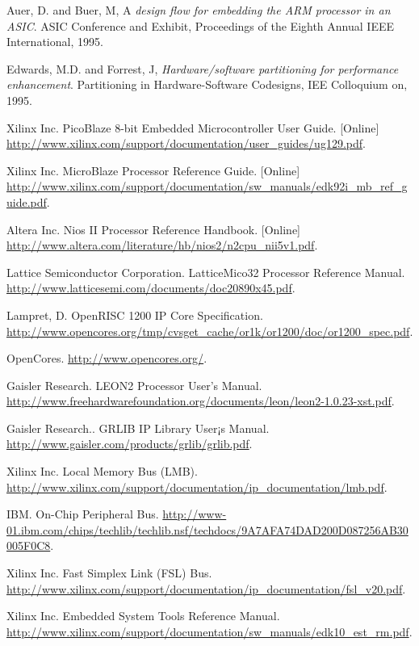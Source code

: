 \documentclass[a4paper,12pt]{report}
\begin{document}
\begin{thebibliography}{99}
Auer, D. and Buer, M, A \textit{design flow for embedding the ARM processor in an ASIC}. ASIC Conference and Exhibit, Proceedings of the Eighth Annual IEEE International, 1995.

Edwards, M.D. and Forrest, J, \textit{Hardware/software partitioning for performance enhancement}. Partitioning in Hardware-Software Codesigns, IEE Colloquium on, 1995.

Xilinx Inc. PicoBlaze 8-bit Embedded Microcontroller User Guide. [Online] \url{http://www.xilinx.com/support/documentation/user_guides/ug129.pdf}.

 Xilinx Inc. MicroBlaze Processor Reference Guide. [Online] \url{http://www.xilinx.com/support/documentation/sw_manuals/edk92i_mb_ref_guide.pdf}.

 Altera Inc. Nios II Processor Reference Handbook. [Online] \url{http://www.altera.com/literature/hb/nios2/n2cpu_nii5v1.pdf}.

Lattice Semiconductor Corporation. LatticeMico32 Processor Reference Manual. 
\url{http://www.latticesemi.com/documents/doc20890x45.pdf}.

Lampret, D. OpenRISC 1200 IP Core Specification. \url{http://www.opencores.org/tmp/cvsget_cache/or1k/or1200/doc/or1200_spec.pdf}.

OpenCores. \url{http://www.opencores.org/}.

Gaisler Research. LEON2 Processor User's Manual. 
\url{http://www.freehardwarefoundation.org/documents/leon/leon2-1.0.23-xst.pdf}.

Gaisler Research.. GRLIB IP Library User¡s Manual. \url{http://www.gaisler.com/products/grlib/grlib.pdf}.

 Xilinx Inc. Local Memory Bus (LMB). \url{http://www.xilinx.com/support/documentation/ip_documentation/lmb.pdf}.

IBM. On-Chip Peripheral Bus.  \url{http://www-01.ibm.com/chips/techlib/techlib.nsf/techdocs/9A7AFA74DAD200D087256AB30005F0C8}.

 Xilinx Inc. Fast Simplex Link (FSL) Bus.  \url{http://www.xilinx.com/support/documentation/ip_documentation/fsl_v20.pdf}.

Xilinx Inc. Embedded System Tools Reference Manual.  \url{http://www.xilinx.com/support/documentation/sw_manuals/edk10_est_rm.pdf}.


\end{thebibliography}
\end{document}

